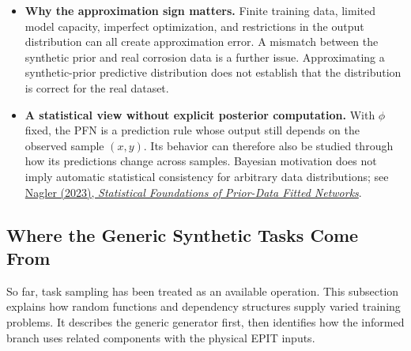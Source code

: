 \documentclass[11pt]{article}
\newenvironment{notes}
  {\begin{itemize}\setlength{\itemsep}{0.45em}\setlength{\parsep}{0pt}}
  {\end{itemize}}
\begin{document}
\begin{notes}
    \item \textbf{Why the approximation sign matters.} Finite
    training data, limited model capacity, imperfect optimization,
    and restrictions in the output distribution can all create
    approximation error. A mismatch between the synthetic prior
    and real corrosion data is a further issue. Approximating a
    synthetic-prior predictive distribution does not establish
    that the distribution is correct for the real dataset.

    \item \textbf{A statistical view without explicit posterior
    computation.} With \(\phi\) fixed, the PFN is a prediction rule
    whose output still depends on the observed sample \((x,y)\).
    Its behavior can therefore also be studied through how its
    predictions change across samples. Bayesian motivation does
    not imply automatic statistical consistency for arbitrary
    data distributions; see
    \href{https://proceedings.mlr.press/v202/nagler23a.html}
    {Nagler (2023), \textit{Statistical Foundations of Prior-Data
    Fitted Networks}}.
\end{notes}


\subsection{Where the Generic Synthetic Tasks Come From}
\label{sec:generic-synthetic-tasks}

So far, task sampling has been treated as an available operation.
This subsection explains how random functions and dependency
structures supply varied training problems. It describes the
generic generator first, then identifies how the informed branch
uses related components with the physical EPIT inputs.
\end{document}
